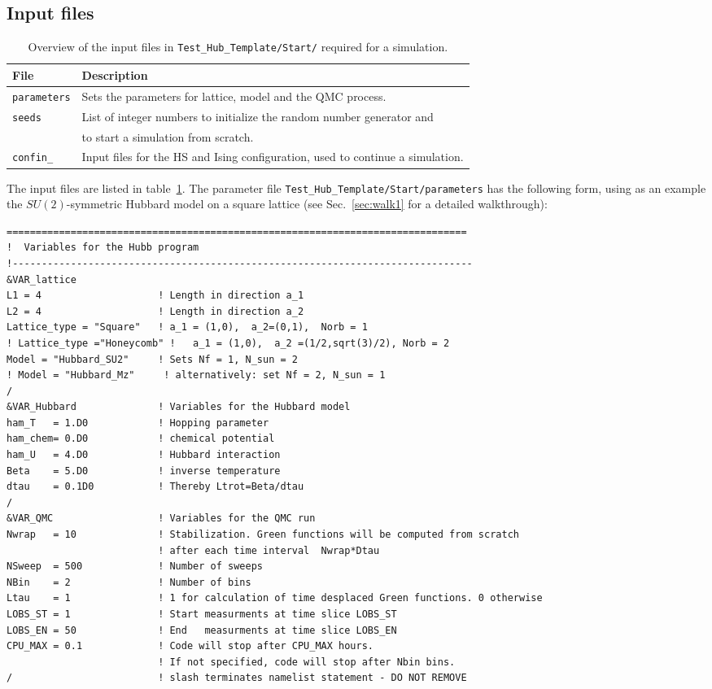 \subsection{Input files}\label{sec:input}
%
\begin{table}[h]
   \begin{tabular}{l l}
   File & Description \\\hline
  \texttt{parameters} &  Sets the parameters for lattice, model and the QMC process.\\
  \texttt{seeds} & List of integer numbers to initialize the random number generator and \\
   & to start a simulation from scratch.\\
  \texttt{confin\_<thread number>} & Input files for the HS and Ising configuration, used to continue a simulation. 
   \end{tabular}
   \caption{Overview of the input files in \texttt{Test\_Hub\_Template/Start/} required for a simulation. \label{table:input}}
\end{table}
%
The input files are listed in table~\ref{table:input}. 
The parameter file \texttt{Test\_Hub\_Template/Start/parameters} has the following form, 
using as an example  the $SU(2)$-symmetric Hubbard model on a square lattice (see Sec.~\ref{sec:walk1} for a detailed walkthrough):
%
\begin{lstlisting} 
===============================================================================
!  Variables for the Hubb program
!-------------------------------------------------------------------------------
&VAR_lattice
L1 = 4                    ! Length in direction a_1
L2 = 4                    ! Length in direction a_2
Lattice_type = "Square"	  ! a_1 = (1,0),  a_2=(0,1),  Norb = 1
! Lattice_type ="Honeycomb" !   a_1 = (1,0),  a_2 =(1/2,sqrt(3)/2), Norb = 2
Model = "Hubbard_SU2"     ! Sets Nf = 1, N_sun = 2
! Model = "Hubbard_Mz"     ! alternatively: set Nf = 2, N_sun = 1
/
&VAR_Hubbard              ! Variables for the Hubbard model
ham_T   = 1.D0            ! Hopping parameter
ham_chem= 0.D0            ! chemical potential
ham_U   = 4.D0            ! Hubbard interaction
Beta    = 5.D0            ! inverse temperature
dtau    = 0.1D0           ! Thereby Ltrot=Beta/dtau
/
&VAR_QMC                  ! Variables for the QMC run
Nwrap   = 10              ! Stabilization. Green functions will be computed from scratch 
                          ! after each time interval  Nwrap*Dtau
NSweep  = 500             ! Number of sweeps
NBin    = 2               ! Number of bins
Ltau    = 1               ! 1 for calculation of time desplaced Green functions. 0 otherwise
LOBS_ST = 1               ! Start measurments at time slice LOBS_ST
LOBS_EN = 50              ! End   measurments at time slice LOBS_EN
CPU_MAX = 0.1             ! Code will stop after CPU_MAX hours. 
                          ! If not specified, code will stop after Nbin bins.
/                         ! slash terminates namelist statement - DO NOT REMOVE
\end{lstlisting}
%

